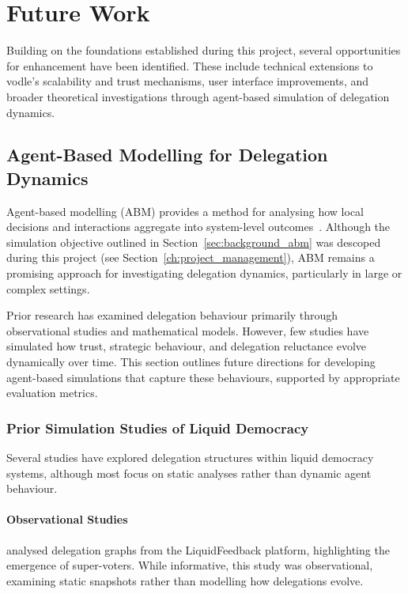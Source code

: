 \chapter{Future Work}\label{ch:future}

Building on the foundations established during this project, several opportunities for enhancement have been identified. These include technical extensions to vodle's scalability and trust mechanisms, user interface improvements, and broader theoretical investigations through agent-based simulation of delegation dynamics.

\section{Agent-Based Modelling for Delegation Dynamics}

Agent-based modelling (ABM) provides a method for analysing how local decisions and interactions aggregate into system-level outcomes~\citep{bonabeau2002agent}. Although the simulation objective outlined in Section~\ref{sec:background_abm} was descoped during this project (see Section~\ref{ch:project_management}), ABM remains a promising approach for investigating delegation dynamics, particularly in large or complex settings.

Prior research has examined delegation behaviour primarily through observational studies and mathematical models. However, few studies have simulated how trust, strategic behaviour, and delegation reluctance evolve dynamically over time. This section outlines future directions for developing agent-based simulations that capture these behaviours, supported by appropriate evaluation metrics.

\subsection{Prior Simulation Studies of Liquid Democracy}

Several studies have explored delegation structures within liquid democracy systems, although most focus on static analyses rather than dynamic agent behaviour.

\subsubsection{Observational Studies}

\citet{kling2015votingbehaviourpoweronline} analysed delegation graphs from the LiquidFeedback platform, highlighting the emergence of super-voters. While informative, this study was observational, examining static snapshots rather than modelling how delegations evolve.

